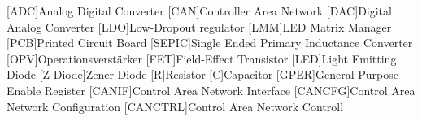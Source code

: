 
\begin{acronym}[ACRONYM]
[ADC]{Analog Digital Converter}
[CAN]{Controller Area Network}
[DAC]{Digital Analog Converter}
[LDO]{Low-Dropout regulator}
[LMM]{LED Matrix Manager}
[PCB]{Printed Circuit Board}
[SEPIC]{Single Ended Primary Inductance Converter}
[OPV]{Operationsverstärker}
[FET]{Field-Effect Transistor}
[LED]{Light Emitting Diode}
[Z-Diode]{Zener Diode}
[R]{Resistor}
[C]{Capacitor}
[GPER]{General Purpose Enable Register}
[CANIF]{Control Area Network Interface}
[CANCFG]{Control Area Network Configuration}
[CANCTRL]{Control Area Network Controll}
\end{acronym}\newpage

